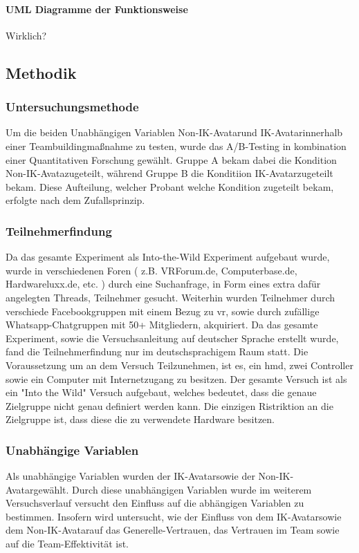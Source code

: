 \documentclass[a4paper,11pt]{article}%
\renewcommand{\\}{\vspace*{0.5\baselineskip} \newline}
\begin{document}
\paragraph{UML Diagramme der Funktionsweise}
	
Wirklich?
	
\subsection{Methodik}
\subsubsection{Untersuchungsmethode}
Um die beiden Unabhängigen Variablen \flqq Non-IK-Avatar\frqq und \flqq IK-Avatar\frqq innerhalb einer Teambuildingmaßnahme zu testen, wurde das A/B-Testing in kombination einer Quantitativen Forschung gewählt.
Gruppe A bekam dabei die Kondition \flqq Non-IK-Avata\frqq zugeteilt, während Gruppe B die Konditiion \flqq IK-Avatar\frqq zugeteilt bekam. Diese Aufteilung, welcher Probant welche Kondition zugeteilt bekam, erfolgte nach dem Zufallsprinzip. 

	\subsubsection{Teilnehmerfindung}
Da das gesamte Experiment als Into-the-Wild Experiment aufgebaut wurde, wurde in verschiedenen Foren ( z.B. VRForum.de, Computerbase.de, Hardwareluxx.de, etc. ) durch eine Suchanfrage, in Form eines extra dafür angelegten Threads, Teilnehmer gesucht. Weiterhin wurden Teilnehmer durch verschiede Facebookgruppen mit einem Bezug zu \ac{vr}, sowie durch zufällige Whatsapp-Chatgruppen mit 50+ Mitgliedern, akquiriert. Da das gesamte Experiment, sowie die Versuchsanleitung auf deutscher Sprache erstellt wurde, fand die Teilnehmerfindung nur im deutschsprachigem Raum statt.
Die Voraussetzung um an dem Versuch Teilzunehmen, ist es, ein \ac{hmd}, zwei Controller sowie ein Computer mit Internetzugang zu besitzen. Der gesamte Versuch ist als ein "Into the Wild" Versuch aufgebaut, welches bedeutet, dass die genaue Zielgruppe nicht genau definiert werden kann. Die einzigen Ristriktion an die Zielgruppe ist, dass diese die zu verwendete Hardware besitzen.\\
		
	\subsubsection{Unabhängige Variablen}
Als unabhängige Variablen wurden der \flqq IK-Avatar\frqq sowie der \flqq Non-IK-Avatar\frqq gewählt. Durch diese  unabhängigen Variablen wurde im weiterem Versuchsverlauf versucht den Einfluss auf die abhängigen Variablen zu bestimmen.
Insofern wird untersucht, wie der Einfluss von dem \flqq IK-Avatar\frqq sowie dem \flqq Non-IK-Avatar\frqq auf das Generelle-Vertrauen, das Vertrauen im Team sowie auf die Team-Effektivität ist.
\end{document}
